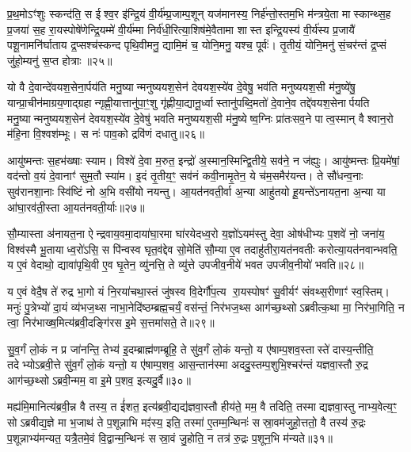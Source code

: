 प्र॒थ॒मोऽꣳ॑शुः स्कन्द॑ति॒ स ईश्व॒र इ॑न्द्रि॒यं वी॒र्य॑म्प्र॒जाम्प॒शून् यज॑मानस्य॒ निर्\mbox{}ह॑न्तो॒स्तम॒भि म॑न्त्रये॒ता मास्कान्थ्स॒ह प्र॒जया॑ स॒ह रा॒यस्पोषे॑णेन्द्रि॒यम्मे॑ वी॒र्य॑म्मा निर्व॑धी॒रित्या॒शिष॑मे॒वैतामा शास्त इन्द्रि॒यस्य॑ वी॒र्य॑स्य प्र॒जायै॑ पशू॒नामनि॑र्घाताय द्र॒प्सश्च॑स्कन्द पृथि॒वीमनु॒ द्यामि॒मं च॒ योनि॒मनु॒ यश्च॒ पूर्वः॑। तृ॒तीयं॒ योनि॒मनु॑ सं॒चर॑न्तं द्र॒प्सं जु॑हो॒म्यनु॑ स॒प्त होत्राः॥२५॥

{\anuvakamend[{त॒र्पय॑त माऽभिषू॒यमा॑णस्य॒ यश्च॒ दश॑ च॥८॥}]}

यो वै दे॒वान्दे॑वयश॒सेना॒र्पय॑ति मनु॒ष्यान्मनुष्ययश॒सेन॑ देवयश॒स्ये॑व दे॒वेषु॒ भव॑ति मनुष्ययश॒सी म॑नु॒ष्ये॑षु॒ यान्प्रा॒चीन॑माग्रय॒णाद्ग्रहान्गृह्णी॒यात्तानु॑पा॒ꣳ॒शु गृ॑ह्णीया॒द्यानू॒र्ध्वास्तानु॑पब्दि॒मतो॑ दे॒वाने॒व तद्दे॑वयश॒सेनार्पयति मनु॒ष्यान्मनुष्ययश॒सेन॑ देवयश॒स्ये॑व दे॒वेषु॑ भवति मनुष्ययश॒सी म॑नु॒ष्येष्व॒ग्निः प्रा॑तःसव॒ने पात्व॒स्मान् वैश्वान॒रो म॑हि॒ना वि॒श्वश॑म्भूः। स नः॑ पाव॒को द्रवि॑णं दधातु॥२६॥

आयु॑ष्मन्तः स॒हभ॑ख्षाः स्याम। विश्वे॑ दे॒वा म॒रुत॒ इन्द्रो॑ अ॒स्मान॒स्मिन्द्वि॒तीये॒ सव॑ने॒ न ज॑ह्युः। आयु॑ष्मन्तः प्रि॒यमे॑षां॒ वद॑न्तो व॒यं दे॒वानाꣳ॑ सुम॒तौ स्या॑म। इ॒दं तृ॒तीय॒ꣳ॒ सव॑नं कवी॒नामृ॒तेन॒ ये च॑म॒समैर॑यन्त। ते सौ॑धन्व॒नाः सुव॑रानशा॒नाः स्वि॑ष्टिं नो अ॒भि वसी॑यो नयन्तु। आ॒यत॑नवती॒र्वा अ॒न्या आहु॑तयो हू॒यन्ते॑ऽनायत॒ना अ॒न्या या आ॑घा॒रव॑ती॒स्ता आ॒यत॑नवती॒र्याः॥२७॥

सौ॒म्यास्ता अ॑नायत॒ना ऐन्द्रवाय॒वमा॒दाया॑घा॒रमा घा॑रयेदध्व॒रो य॒ज्ञो॑ऽयम॑स्तु देवा॒ ओष॑धीभ्यः प॒शवे॑ नो॒ जना॑य॒ विश्व॑स्मै भू॒तायाध्व॒रो॑ऽसि॒ स पि॑न्वस्व घृत॒व॑द्देव सो॒मेति॑ सौ॒म्या ए॒व तदाहु॑तीरा॒यत॑नवतीः करोत्या॒यत॑नवान्भवति॒ य ए॒वं वेदाथो॒ द्यावा॑पृथि॒वी ए॒व घृ॒तेन॒ व्यु॑नत्ति॒ ते व्यु॑त्ते उपजीव॒नीये॑ भवत उपजीव॒नीयो॑ भवति॥२८॥

य ए॒वं वेदै॒ष ते॑ रुद्र भा॒गो यं नि॒रया॑चथा॒स्तं जु॑षस्व वि॒देर्गौ॑प॒त्य रा॒यस्पोषꣳ॑ सु॒वीर्यꣳ॑ संवथ्स॒रीणाꣳ॑ स्व॒स्तिम्। मनुः॑ पु॒त्रेभ्यो॑ दा॒यं व्य॑भज॒थ्स नाभा॒नेदि॑ष्ठम्ब्रह्म॒चर्यं॒ वस॑न्तं॒ निर॑भज॒थ्स आग॑च्छ॒थ्सोऽब्रवीत्क॒था मा॒ निर॑भा॒गिति॒ न त्वा॒ निर॑भाख्ष॒मित्य॑ब्रवी॒दङ्गि॑रस इ॒मे स॒त्तमा॑सते॒ ते॥२९॥

सु॒व॒र्गं लो॒कं न प्र जा॑नन्ति॒ तेभ्य॑ इ॒दम्ब्राह्म॑णम्ब्रूहि॒ ते सु॑व॒र्गं लो॒कं यन्तो॒ य ए॑षाम्प॒शव॒स्तास्ते॑ दास्य॒न्तीति॒ तदेभ्योऽब्रवी॒त्ते सु॑व॒र्गं लो॒कं यन्तो॒ य ए॑षाम्प॒शव॒ आस॒न्तान॑स्मा अददु॒स्तम्प॒शुभि॒श्चर॑न्तं यज्ञवा॒स्तौ रु॒द्र आग॑च्छ॒थ्सोऽब्रवी॒न्मम॒ वा इ॒मे प॒शव॒ इत्यदु॒र्वै॥३०॥

मह्य॑मि॒मानित्य॑ब्रवी॒न्न वै तस्य॒ त ई॑शत॒ इत्य॑ब्रवी॒द्यद्य॑ज्ञवा॒स्तौ हीय॑ते॒ मम॒ वै तदिति॒ तस्माद्यज्ञवा॒स्तु नाभ्य॒वेत्य॒ꣳ॒ सोऽब्रवीद्य॒ज्ञे मा भ॒जाथ॑ ते प॒शून्नाभि मꣵ॑स्य॒ इति॒ तस्मा॑ ए॒तम्म॒न्थिनः॑ सस्रा॒वम॑जुहो॒त्ततो॒ वै तस्य॑ रु॒द्रः प॒शून्नाभ्य॑मन्यत॒ यत्रै॒तमे॒वं वि॒द्वान्म॒न्थिनः॑ सस्रा॒वं जु॒होति॒ न तत्र॑ रु॒द्रः प॒शून॒भि म॑न्यते॥३१॥

